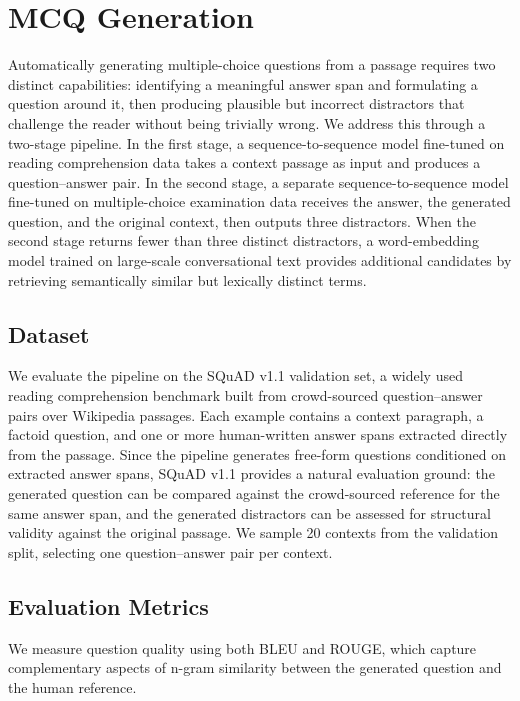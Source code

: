 \section{MCQ Generation}

Automatically generating multiple-choice questions from a passage requires two distinct capabilities: identifying a meaningful answer span and formulating a question around it, then producing plausible but incorrect distractors that challenge the reader without being trivially wrong. We address this through a two-stage pipeline. In the first stage, a sequence-to-sequence model fine-tuned on reading comprehension data takes a context passage as input and produces a question–answer pair. In the second stage, a separate sequence-to-sequence model fine-tuned on multiple-choice examination data receives the answer, the generated question, and the original context, then outputs three distractors. When the second stage returns fewer than three distinct distractors, a word-embedding model trained on large-scale conversational text provides additional candidates by retrieving semantically similar but lexically distinct terms.

\subsection{Dataset}

We evaluate the pipeline on the SQuAD v1.1 validation set, a widely used reading comprehension benchmark built from crowd-sourced question–answer pairs over Wikipedia passages. Each example contains a context paragraph, a factoid question, and one or more human-written answer spans extracted directly from the passage. Since the pipeline generates free-form questions conditioned on extracted answer spans, SQuAD v1.1 provides a natural evaluation ground: the generated question can be compared against the crowd-sourced reference for the same answer span, and the generated distractors can be assessed for structural validity against the original passage. We sample 20 contexts from the validation split, selecting one question–answer pair per context.

\subsection{Evaluation Metrics}

We measure question quality using both BLEU and ROUGE, which capture complementary aspects of n-gram similarity between the generated question and the human reference.

